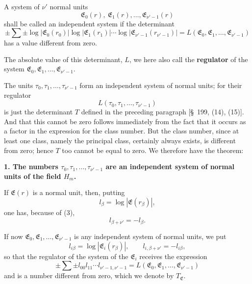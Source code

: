 \documentclass[11pt]{article}
\begin{document}
A system of $\nu'$ normal units
\[
\mathfrak E_0(r),\ \mathfrak E_1(r),\ldots,\mathfrak E_{\nu'-1}(r)
\]
shall be called an independent system if the determinant
\begin{equation}
\pm\sum\pm\log|\mathfrak E_0(r_0)|\log|\mathfrak E_1(r_1)|\cdots\log|\mathfrak E_{\nu'-1}(r_{\nu'-1})|
=L(\mathfrak E_0,\mathfrak E_1,\ldots,\mathfrak E_{\nu'-1})
\tag{6}
\end{equation}
has a value different from zero.

The absolute value of this determinant, $L$, we here also call the \textbf{regulator} of the system $\mathfrak E_0,\mathfrak E_1,\ldots,\mathfrak E_{\nu'-1}$.

The units $\tau_0,\tau_1,
\ldots,\tau_{\nu'-1}$ form an independent system of normal units; for their regulator
\[
L(\tau_0,\tau_1,\ldots,\tau_{\nu'-1})
\]
is just the determinant $T$ defined in the preceding paragraph [\S~199, (14), (15)]. And that this cannot be zero follows immediately from the fact that it occurs as a factor in the expression for the
class number. But the class number, since at least one class, namely the principal class, certainly always exists, is different from zero; hence $T$ too cannot be equal to zero. We therefore have the theorem:

\begin{center}\textbf{1. The numbers $\tau_0,\tau_1,\ldots,\tau_{\nu'-1}$ are an independent system of normal units of the field $H_m$.}\end{center}

If $\mathfrak E(r)$ is a normal unit, then, putting
\begin{equation}
l_\beta=\log|\mathfrak E(r_\beta)|,
\tag{7}
\end{equation}
one has, because of (3),
\begin{equation}
l_{\beta+\nu'}=-l_\beta.
\tag{8}
\end{equation}

If now $\mathfrak E_0,\mathfrak E_1,\ldots,\mathfrak E_{\nu'-1}$ is any independent system of normal units, we put
\begin{equation}
l_{i\beta}=\log|\mathfrak E_i(r_\beta)|,\qquad l_{i,\beta+\nu'}=-l_{i\beta},
\tag{9}
\end{equation}
so that the regulator of the system of the $\mathfrak E_i$ receives the expression
\begin{equation}
\pm\sum\pm l_{00}l_{11}\cdots l_{\nu'-1,\nu'-1}=L(\mathfrak E_0,\mathfrak E_1,\ldots,\mathfrak E_{\nu'-1})
\tag{10}
\end{equation}
and is a number different from zero, which we denote by $T_\mathfrak E$.
\end{document}
